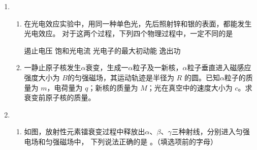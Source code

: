 


\begin{enumerate}
	\item
{}
\begin{enumerate}
	\item
在光电效应实验中，用同一种单色光，先后照射锌和银的表面，都能发生光电效应。
对于这两个过程，下列四个物理过程中，一定不同的是  

\fourchoices
{遏止电压}
{饱和光电流}
{光电子的最大初动能}
{逸出功}


\item 
一静止原子核发生$ \alpha $衰变，生成一$ \alpha $粒子及一新核，$ \alpha $粒子垂直进入磁感应强度大小为
$ B $的匀强磁场，其运动轨迹是半径为 $ R $ 的圆。已知$ \alpha $粒子的质量为 $ m $，电荷量为 $ q $；新核的质量为
$ M $；光在真空中的速度大小为 $ c $。求衰变前原子核的质量。



	
\end{enumerate}

\item 
{}
\begin{enumerate}
	\item
如图，放射性元素镭衰变过程中释放出$ \alpha $、$ \beta $、$ \gamma $三种射线，分别进入匀强电场和匀强磁场中，
下列说法正确的是 \underlinegap 。（填选项前的字母）
\begin{figure}[h!]
	\centering
  
 \hfil
  
\end{figure}


\end{enumerate}
\end{enumerate}
